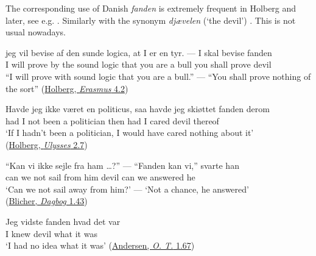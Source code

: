 The corresponding use of Danish \textit{fanden} is extremely frequent in Holberg and later, see e.g. . Similarly with the synonym \textit{djævelen} (`the devil') . This is not usual nowadays.

\ea \label{ex:04-212}
\ea
\gll jeg vil bevise af den sunde logica, at I er en tyr. --- I skal bevise fanden\\
 I will prove by the sound logic that you are a bull {} you shall prove devil\\
\glt ``I will prove with sound logic that you are a bull.'' --- ``You shall prove nothing of the sort''
\hfill(\href{http://holbergsskrifter.dk/holberg-public/view?docId=skuespill%2FErasmus%2FErasmus.page&brand=&chunk.id=act4sc2&toc.id=act4&toc.depth=1}{Holberg, \textit{Erasmus} 4.2})

\ex{}
\gll Havde jeg ikke været en politicus, saa havde jeg skiøttet fanden derom\\
 had I not been a politician then had I cared devil thereof\\
\glt `If I hadn't been a politician, I would have cared nothing about it'\\
\hfill(\href{http://holbergsskrifter.dk/holberg-public/view?docId=skuespill%2FUlysses%2FUlysses.page&brand=&chunk.id=act2sc7&toc.id=act2&toc.depth=1}{Holberg, \textit{Ulysses} 2.7}) %

\ex{}
\gll ``Kan vi ikke sejle fra ham {{\dots}?'' ---} ``Fanden kan vi,'' svarte han\\
 can we not sail from him {} devil can we answered he\\
\glt `Can we not sail away from him?' --- `Not a chance, he answered'\\
\hfill(\href{https://books.google.com/books?id=8aeyxdW_f_oC&pg=PA120&lpg=PA120&dq=blicher+%22Fanden+kan+vi\%22&source=bl&ots=oMK334LyIt&sig=ACfU3U1mh55vPZ6ivVj_YBWpBx2dJEk1jQ&hl=en&sa=X&ved=2ahUKEwietaSn68-EAxU2ZvUHHUJ0A04Q6AF6BAgIEAM#v=onepage&q=blicher%20%22Fanden%20kan%20vi\%22&f=false}{Blicher, \textit{Dagbog} 1.43})

\ex
\gll Jeg vidste fanden hvad det var\\
 I knew devil what it was\\
\glt `I had no idea what it was'
\hfill(\href{https://tekster.kb.dk/text/adl-texts-andersen04val-root#idm140137151050288}{Andersen, \textit{O. T.} 1.67})

